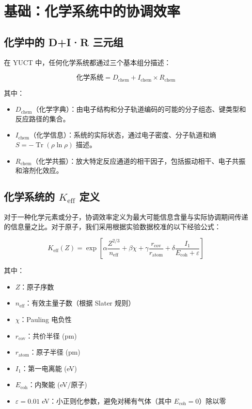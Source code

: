 \documentclass[11pt,a4paper]{article}
\newcommand{\Keff}{K_{\mathrm{eff}}}
\DeclareMathOperator{\Tr}{Tr}
\begin{document}
	\section{基础：化学系统中的协调效率}
	\label{sec:foundations}
	
	\subsection{化学中的 D+I·R 三元组}
	
	在 YUCT 中，任何化学系统都通过三个基本组分描述：
	
	\begin{equation}
		\text{化学系统} = D_{\text{chem}} + I_{\text{chem}} \times R_{\text{chem}}
		\label{eq:chem-triad}
	\end{equation}
	
	其中：
	\begin{itemize}
		\item $D_{\text{chem}}$（化学字典）：由电子结构和分子轨道编码的可能的分子组态、键类型和反应路径的集合。
		\item $I_{\text{chem}}$（化学信息）：系统的实际状态，通过电子密度、分子轨道和熵 $S = -\Tr(\rho \ln \rho)$ 描述。
		\item $R_{\text{chem}}$（化学共振）：放大特定反应通道的相干因子，包括振动相干、电子共振和溶剂化效应。
	\end{itemize}
	
	\subsection{化学系统的 $\Keff$ 定义}
	
	对于一种化学元素或分子，协调效率定义为最大可能信息含量与实际协调期间传递的信息量之比。对于原子，我们采用根据实验数据校准的以下经验公式：
	
	\begin{equation}
		\Keff(Z) = \exp\left[\alpha \frac{Z^{2/3}}{n_{\text{eff}}} + \beta \chi + \gamma \frac{r_{\text{cov}}}{r_{\text{atom}}} + \delta \frac{I_1}{E_{\text{coh}} + \varepsilon}\right]
		\label{eq:keff-element}
	\end{equation}
	
	其中：
	\begin{itemize}
		\item $Z$：原子序数
		\item $n_{\text{eff}}$：有效主量子数（根据 Slater 规则）
		\item $\chi$：Pauling 电负性
		\item $r_{\text{cov}}$：共价半径 (pm)
		\item $r_{\text{atom}}$：原子半径 (pm)
		\item $I_1$：第一电离能 (eV)
		\item $E_{\text{coh}}$：内聚能 (eV/原子)
		\item $\varepsilon = 0.01$ eV：小正则化参数，避免对稀有气体（其中 $E_{\text{coh}} = 0$）除以零
	\end{itemize}
	
\end{document}

